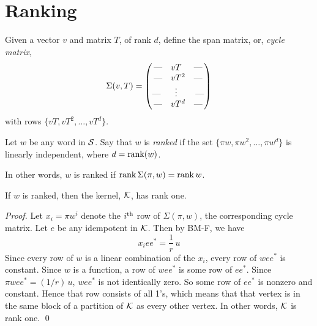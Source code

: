 
\section{Ranking}
\label{sec:6.6}

\begin{definition} 	\label{defn:6.1}

Given a vector $v$ and matrix $T$, of rank $d$, define the span matrix, or, \textsl{cycle matrix\/}, 
$$
  \Sigma(v,T)=\begin{pmatrix}
  \hbox{---\quad} v T^{\hphantom 2} \hbox{\quad---} \cr 
  \hbox{---\quad}v T^2 \hbox{\quad---} \cr 
  \hbox{---\quad} \ \ \vdots^{\hphantom 2} \ \  \hbox{\quad---} \cr 
  \hbox{---\quad} v T^d \hbox{\quad---} \cr
  \end{pmatrix}
$$
with rows $\{vT,vT^2,\ldots,vT^d\}$.
\end{definition}

\begin{definition} 	\label{defn:6.2}

Let $w$ be any word in ${\mathcal S}$. 
Say that $w$ is \textsl{ranked\/} if the set $\{\pi w,\pi w^2,\ldots,\pi w^d\}$ is linearly independent, where $d={\rm rank}(w)$. 
\end{definition}

In other words, $w$ is ranked if ${\rm rank}\, \Sigma(\pi,w)={\rm rank}\, w$.

\begin{theorem} 	\label{thm:6.1}
If $w$ is ranked, then the kernel, ${\mathcal K}$, has rank one.
\end{theorem}

\begin{proof} Let $x_i=\pi w^i$ denote the $i^{\rm th}$ row of $\Sigma(\pi,w)$, the corresponding cycle matrix.
Let $e$ be any idempotent in ${\mathcal K}$. Then by BM-F, we have 
$$
  x_i ee^*=\frac{1}{r}\,u
$$ 
Since every row of $w$ is a linear combination of the $x_i$, every row of $wee^*$ is constant. Since $w$ is a function,
a row of $wee^*$ is some row of $ee^*$. Since $\pi wee^*=(1/r)\,u$, $wee^*$ is not identically zero. So some row of
$ee^*$ is nonzero and constant. Hence that row consists of all 1's, which means that that vertex is in the same block of a partition of ${\mathcal K}$
as every other vertex. In other words, ${\mathcal K}$ is rank one.   \qed   
\end{proof}

